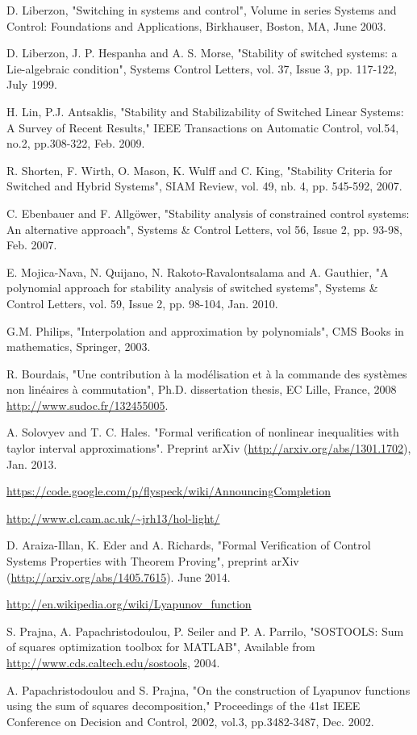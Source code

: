 \documentclass[12pt]{article}
\begin{document}
\begin{thebibliography}{}



 D. Liberzon, "Switching in systems and control", Volume in series Systems and Control: Foundations and Applications, Birkhauser, Boston, MA, June 2003.

 D. Liberzon, J. P. Hespanha and A. S. Morse, "Stability of switched systems: a Lie-algebraic condition", Systems  Control Letters, 
vol. 37, Issue 3, pp. 117-122, July 1999.


 H. Lin, P.J. Antsaklis, "Stability and Stabilizability of Switched Linear Systems: A Survey of Recent Results," IEEE Transactions on Automatic Control,
vol.54, no.2, pp.308-322, Feb. 2009.

 R. Shorten, F. Wirth, O. Mason, K. Wulff and C. King, "Stability Criteria for Switched and Hybrid Systems", SIAM Review, vol. 49, nb. 4, pp. 545-592, 2007.


 C. Ebenbauer and F. Allgöwer, "Stability analysis of constrained control systems: An alternative approach", Systems \& Control Letters, vol 56, 
Issue 2, pp. 93-98, Feb. 2007.

 E. Mojica-Nava, N. Quijano, N. Rakoto-Ravalontsalama and A. Gauthier, "A polynomial approach for stability analysis of switched systems", Systems \& Control Letters, 
vol. 59, Issue 2, pp. 98-104, Jan. 2010. 

 G.M. Philips, "Interpolation and approximation by polynomials", CMS Books in mathematics, Springer, 2003.

 R. Bourdais, "Une contribution \`a la mod\'elisation et \`a la commande des systèmes non lin\'eaires \`a commutation", Ph.D. dissertation thesis, EC Lille, France, 2008 
\url{http://www.sudoc.fr/132455005}.

 A. Solovyev and T. C. Hales. "Formal verification of nonlinear inequalities with taylor interval approximations". Preprint arXiv 
(\url{http://arxiv.org/abs/1301.1702}), Jan. 2013.

 \url{https://code.google.com/p/flyspeck/wiki/AnnouncingCompletion}

 \url{http://www.cl.cam.ac.uk/~jrh13/hol-light/}

 D. Araiza-Illan, K. Eder and A. Richards, "Formal Verification of Control Systems Properties with Theorem Proving", 
preprint arXiv (\url{http://arxiv.org/abs/1405.7615}). June 2014.

 \url{http://en.wikipedia.org/wiki/Lyapunov_function}


  S. Prajna, A. Papachristodoulou, P. Seiler and P. A. Parrilo, "{SOSTOOLS}: Sum of squares optimization toolbox for {MATLAB}", Available from \url{http://www.cds.caltech.edu/sostools}, {2004}.


 A. Papachristodoulou and S. Prajna, "On the construction of Lyapunov functions using the sum of squares decomposition," Proceedings of 
the 41st IEEE Conference on Decision and Control, 2002, vol.3, pp.3482-3487, Dec. 2002.

\end{thebibliography}
\end{document}
